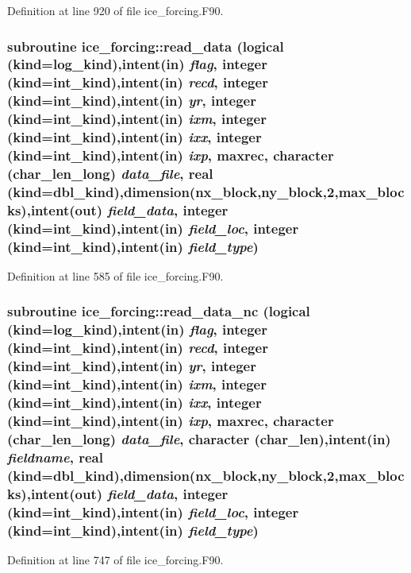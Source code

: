 Definition at line 920 of file ice\_\-forcing.F90.\hypertarget{namespaceice__forcing_a45d48692f330fef1618489012ca9d0a7}{
\subsubsection[{read\_\-data}]{\setlength{\rightskip}{0pt plus 5cm}subroutine ice\_\-forcing::read\_\-data (logical (kind=log\_\-kind),intent(in) {\em flag}, \/  integer (kind=int\_\-kind),intent(in) {\em recd}, \/  integer (kind=int\_\-kind),intent(in) {\em yr}, \/  integer (kind=int\_\-kind),intent(in) {\em ixm}, \/  integer (kind=int\_\-kind),intent(in) {\em ixx}, \/  integer (kind=int\_\-kind),intent(in) {\em ixp}, \/  maxrec, \/  character (char\_\-len\_\-long) {\em data\_\-file}, \/  real (kind=dbl\_\-kind),dimension(nx\_\-block,ny\_\-block,2,max\_\-blocks),intent(out) {\em field\_\-data}, \/  integer (kind=int\_\-kind),intent(in) {\em field\_\-loc}, \/  integer (kind=int\_\-kind),intent(in) {\em field\_\-type})}}
\label{namespaceice__forcing_a45d48692f330fef1618489012ca9d0a7}


Definition at line 585 of file ice\_\-forcing.F90.\hypertarget{namespaceice__forcing_a33953eccfa9abefcd935133786fa04b3}{
\subsubsection[{read\_\-data\_\-nc}]{\setlength{\rightskip}{0pt plus 5cm}subroutine ice\_\-forcing::read\_\-data\_\-nc (logical (kind=log\_\-kind),intent(in) {\em flag}, \/  integer (kind=int\_\-kind),intent(in) {\em recd}, \/  integer (kind=int\_\-kind),intent(in) {\em yr}, \/  integer (kind=int\_\-kind),intent(in) {\em ixm}, \/  integer (kind=int\_\-kind),intent(in) {\em ixx}, \/  integer (kind=int\_\-kind),intent(in) {\em ixp}, \/  maxrec, \/  character (char\_\-len\_\-long) {\em data\_\-file}, \/  character (char\_\-len),intent(in) {\em fieldname}, \/  real (kind=dbl\_\-kind),dimension(nx\_\-block,ny\_\-block,2,max\_\-blocks),intent(out) {\em field\_\-data}, \/  integer (kind=int\_\-kind),intent(in) {\em field\_\-loc}, \/  integer (kind=int\_\-kind),intent(in) {\em field\_\-type})}}
\label{namespaceice__forcing_a33953eccfa9abefcd935133786fa04b3}


Definition at line 747 of file ice\_\-forcing.F90.

